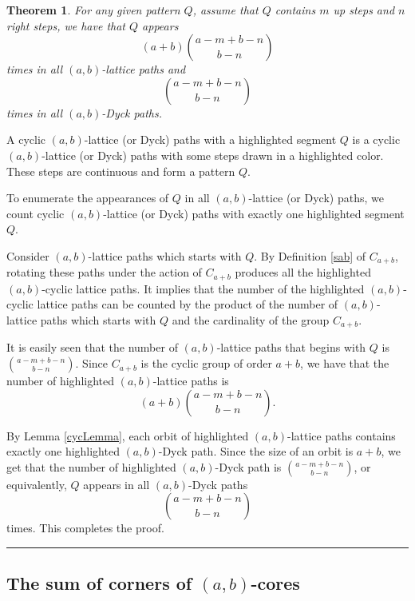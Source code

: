 \documentclass[a4paper,12pt]{article}
\def \remark {\noindent \emph{Remark. }}
\newtheorem{thm}{Theorem}[section]
\newcommand{\qed}{{\hfill\rule{4pt}{7pt}}}
\def\pf{\noindent {\it Proof.} }
\begin{document}
%



%


\begin{thm}\label{meibiao}
For any given pattern $Q$, assume that $Q$ contains $m$ up steps and $n$ right steps, we have that $Q$ appears $$(a+b) \binom{a-m+b-n}{b-n}$$ times in all $(a,b)$-lattice paths and $$\binom{a-m+b-n}{b-n}$$ times in all $(a,b)$-Dyck paths.
\end{thm}

\pf
A cyclic $(a,b)$-lattice (or Dyck) paths with a highlighted segment $Q$ is a cyclic $(a,b)$-lattice (or Dyck) paths with some steps drawn in a highlighted color. These steps are continuous and form a pattern $Q$.

 To enumerate the appearances of $Q$ in all $(a,b)$-lattice (or Dyck) paths, we count cyclic $(a,b)$-lattice (or Dyck) paths with exactly one highlighted segment $Q$.

Consider  $(a,b)$-lattice paths which starts with $Q$. By Definition \ref{sab} of $C_{a+b}$, rotating these paths under the action of $C_{a+b}$ produces all the highlighted $(a,b)$-cyclic lattice paths. It implies that the number of the highlighted $(a,b)$-cyclic lattice paths can be counted by the product of the number of $(a,b)$-lattice paths which starts with $Q$ and the cardinality of the group $C_{a+b}$.

It is easily seen that the number of $(a,b)$-lattice paths that begins with $Q$ is $\binom{a-m+b-n}{b-n}$. Since $C_{a+b}$ is the cyclic group of order $a+b$, we have that the number of highlighted $(a,b)$-lattice paths is $$(a+b) \binom{a-m+b-n}{b-n}.$$

By Lemma \ref{cycLemma}, each orbit of highlighted $(a,b)$-lattice paths contains exactly one highlighted $(a,b)$-Dyck path. Since the size of an orbit is $a+b$, we get that the number of highlighted $(a,b)$-Dyck path is $\binom{a-m+b-n}{b-n}$, or equivalently, $Q$ appears in all $(a,b)$-Dyck paths $$\binom{a-m+b-n}{b-n}$$ times. This completes the proof.
\qed

\subsection{The sum of corners of $(a,b)$-cores}
\end{document}
